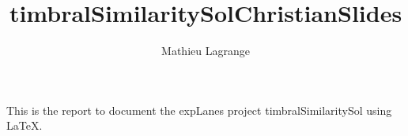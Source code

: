 \documentclass{beamer}
\title{timbralSimilaritySolChristianSlides}
\author{ Mathieu Lagrange }
\begin{document}
 
  
\maketitle 
  
  
This is the report to document the expLanes project timbralSimilaritySol using \LaTeX. 
  
  
  
 
 
  
\end{document}
